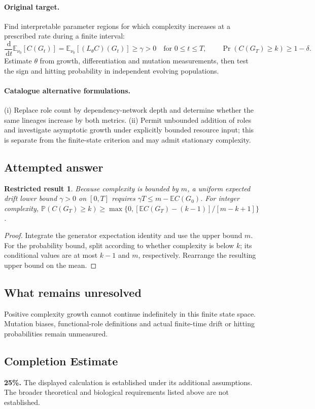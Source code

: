 \documentclass[11pt]{article}
\newcommand{\E}{\mathbb E}
\newcommand{\Prob}{\mathbb P}
\newcommand{\dd}{\,\mathrm d}
\providecommand{\E}{\mathbb E}
\providecommand{\Prob}{\mathbb P}
\newtheorem{attemptresult}{Restricted result}[section]
\begin{document}
\paragraph{Original target.}
Find interpretable parameter regions for which complexity increases at a prescribed rate during a finite interval:
\[
 \frac{\dd}{\dd t}\E_{\nu_0}[C(G_t)]
 =\E_{\nu_0}[(L_\theta C)(G_t)]\ge\gamma>0
 \quad\text{for }0\le t\le T,
 \qquad \Pr(C(G_T)\ge k)\ge1-\delta.
\]
Estimate $\theta$ from growth, differentiation and mutation measurements, then test the sign and hitting probability in independent evolving populations.
\paragraph{Catalogue alternative formulations.}
(i) Replace role count by dependency-network depth and determine whether the same lineages increase by both metrics. (ii) Permit unbounded addition of roles and investigate asymptotic growth under explicitly bounded resource input; this is separate from the finite-state criterion and may admit stationary complexity.
\subsection{Attempted answer}
\begin{attemptresult}
Because complexity is bounded by $m$, a uniform expected drift lower bound $\gamma>0$ on $[0,T]$ requires $\gamma T\leq m-\E C(G_0)$. For integer complexity, $\Prob(C(G_T)\geq k)\geq\max\{0,[\E C(G_T)-(k-1)]/[m-k+1]\}$.
\end{attemptresult}
\begin{proof}
Integrate the generator expectation identity and use the upper bound $m$. For the probability bound, split according to whether complexity is below $k$; its conditional values are at most $k-1$ and $m$, respectively. Rearrange the resulting upper bound on the mean.
\end{proof}
\subsection{What remains unresolved}
Positive complexity growth cannot continue indefinitely in this finite state space. Mutation biases, functional-role definitions and actual finite-time drift or hitting probabilities remain unmeasured.
\subsection{Completion Estimate}
\textbf{25\%.} The displayed calculation is established under its additional assumptions. The broader theoretical and biological requirements listed above are not established.
\end{document}
